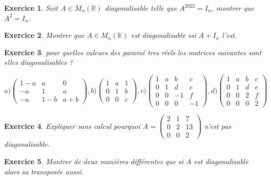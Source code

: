 \documentclass[12pt,a4paper]{article}
\newcommand{\R}{\mathbb{R}}
\newcommand{\K}{\mathbb{K} }
\theoremstyle{break}
\theoremstyle{break}
\newtheorem{Exo}{Exercice}
\begin{document}
\begin{Exo}
	Soit $A\in M_n(\R)$ diagonalisable telle que $A^{2022}=I_n$, montrer que $A^2=I_n$.
\end{Exo}

\begin{Exo}
	Montrer que $A\in M_n(\K)$ est diagonalisable ssi $A+I_n$ l'est.
\end{Exo}

\begin{Exo}
	pour quelles valeurs des param\'{e}%
	tres r\'{e}els les matrices suivantes sont elles diagonalisables ?
	
	$a)\left( 
	\begin{array}{ccc}
		1-a & a & 0 \\ 
		-a & 1 & a \\ 
		-a & 1-b & a+b%
	\end{array}%
	\right) ,b)\left( 
	\begin{array}{ccc}
		1 & a & 1 \\ 
		0 & 1 & b \\ 
		0 & 0 & c%
	\end{array}%
	\right) ,c)\left( 
	\begin{array}{llll}
		1 & a & b & c \\ 
		0 & 1 & d & e \\ 
		0 & 0 & -1 & f \\ 
		0 & 0 & 0 & -1%
	\end{array}%
	\right) ,d)\left( 
	\begin{array}{llll}
		1 & a & b & c \\ 
		0 & 1 & d & e \\ 
		0 & 0 & 2 & f \\ 
		0 & 0 & 0 & 2%
	\end{array}%
	\right)$
\end{Exo}

\begin{Exo}
	Expliquer sans calcul pourquoi $A=\begin{pmatrix}
		2 & 1 & 7 \\
		0 & 2 & 13 \\
		0 & 0 & 2
	\end{pmatrix}$ n'est pas diagonalisable.
	
\end{Exo}

\begin{Exo}
	Montrer de deux manières différentes que si $A$ est diagonalisable alors sa transposée aussi.
\end{Exo}
\end{document}
